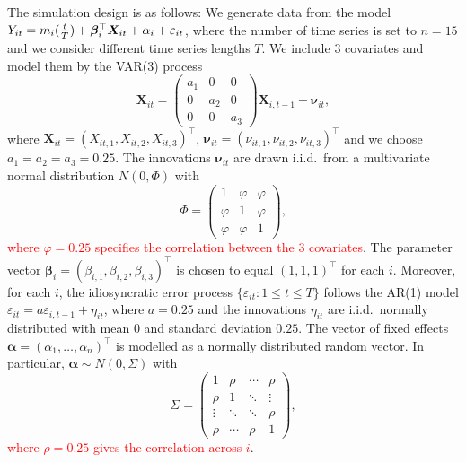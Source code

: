 \documentclass[12pt]{article}
\begin{document}
The simulation design is as follows: We generate data from the model $Y_{it} = m_i(\frac{t}{T}) + \bm{\beta}_i^\top \boldsymbol{X}_{it} +  \alpha_i  + \varepsilon_{it}$, where the number of time series is set to $n = 15$ and we consider different time series lengths $T$. We include $3$ covariates and model them by the VAR(3) process
\[ \boldsymbol{X}_{it} = \begin{pmatrix} a_1 & 0 & 0 \\ 0 & a_2 & 0 \\ 0 & 0 & a_3 \end{pmatrix} \boldsymbol{X}_{i,t-1} + \boldsymbol{\nu}_{it}, \] 
where $\boldsymbol{X}_{it} = ( X_{it,1}, X_{it,2}, X_{it,3} )^\top$, $\boldsymbol{\nu}_{it} = ( \nu_{it,1}, \nu_{it,2}, \nu_{it,3} )^\top$ and we choose $a_1 = a_2 = a_3 = 0.25$. The innovations $\boldsymbol{\nu}_{it}$ are drawn i.i.d.\ from a multivariate normal distribution $N(0,\Phi)$ with
\[ \Phi = \begin{pmatrix} 1 & \varphi & \varphi \\ \varphi & 1 & \varphi \\ \varphi & \varphi & 1 \end{pmatrix}, \]
\textcolor{red}{where $\varphi = 0.25$ specifies the correlation between the 3 covariates}.
The parameter vector $\boldsymbol{\beta}_i = (\beta_{i,1},\beta_{i,2},\beta_{i,3})^\top$ is chosen to equal $(1,1,1)^\top$ for each $i$. Moreover, for each $i$, the idiosyncratic error process $\{\varepsilon_{it}: 1 \le t \le T\}$ follows the AR(1) model $\varepsilon_{it} = a \varepsilon_{i, t-1} + \eta_{it}$, where $a = 0.25$ and the innovations $\eta_{it}$ are i.i.d.\ normally distributed with mean $0$ and standard deviation $0.25$. 
The vector of fixed effects $\boldsymbol{\alpha} = (\alpha_1,\ldots,\alpha_n)^\top$ is modelled as a normally distributed random vector. In particular, $\boldsymbol{\alpha} \sim N(0,\Sigma)$ with
\[ \Sigma =
\begin{pmatrix}
1      & \rho   & \cdots & \rho   \\
\rho   & 1      & \ddots & \vdots \\
\vdots & \ddots & \ddots & \rho   \\
\rho   & \cdots & \rho   & 1
\end{pmatrix},
\]
\textcolor{red}{where $\rho = 0.25$ gives the correlation across $i$}.
\end{document}
